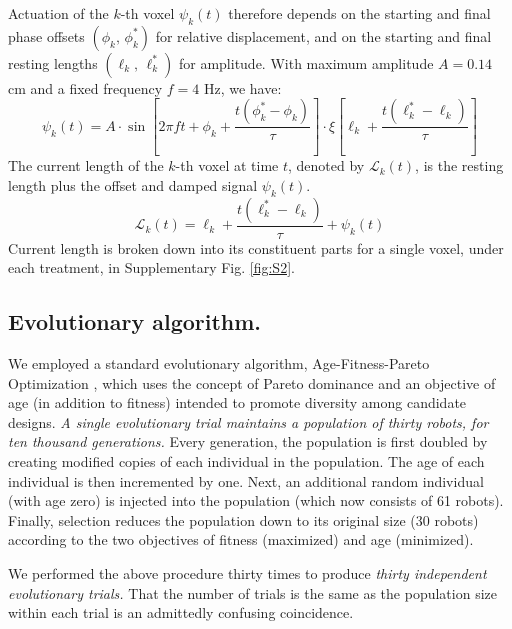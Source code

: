 Actuation of the $k$-th voxel $\psi_k(t)$ therefore depends on the starting and final phase offsets $(\phi_k,\, \phi_k^*)$ for relative displacement, and on the starting and final resting lengths $(\ell_k,\, \ell_k^*)$ for amplitude. With maximum amplitude $A=0.14$ cm and a fixed frequency $f=4$ Hz, we have:
\begin{equation}
\label{eq-actuation}
\psi_k(t) = A \cdot \sin\left[2\pi f t + \phi_k + \frac{t(\phi_k^*-\phi_k)}{\tau}\right] \cdot \xi\left[\ell_k + \frac{t(\ell_k^*-\ell_k)}{\tau}\right]
\end{equation}
The current length of the $k$-th voxel at time $t$, denoted by $\mathcal{L}_k(t)$, is the resting length plus the offset and damped signal $\psi_k(t)$.
\begin{equation}
\label{eq-curr-length}
\mathcal{L}_k(t) = \ell_k + \frac{t(\ell_k^*-\ell_k)}{\tau} + \psi_k(t)
\end{equation}
Current length is broken down into its constituent parts for a single 
voxel, under each treatment, in Supplementary Fig. \ref{fig:S2}.%



\subsection*{Evolutionary algorithm.}

We employed a standard evolutionary algorithm, Age-Fitness-Pareto Optimization \cite{schmidt2011age}, which uses the concept of Pareto dominance and an objective of age (in addition to fitness) intended to promote diversity among candidate designs. 
\textit{A single evolutionary trial maintains a population of thirty robots, for ten thousand generations.}
Every generation, the population is first doubled by creating modified copies of each individual in the population.
The age of each individual is then incremented by one.
Next, an additional random individual (with age zero) is injected into the population (which now consists of 61 robots). 
Finally, selection reduces the population down to its original size (30 robots) according to the two objectives of fitness (maximized) and age (minimized).

We performed the above procedure thirty times to produce \textit{thirty independent evolutionary trials.}
That the number of trials is the same as the population size within each trial is an admittedly confusing coincidence.

